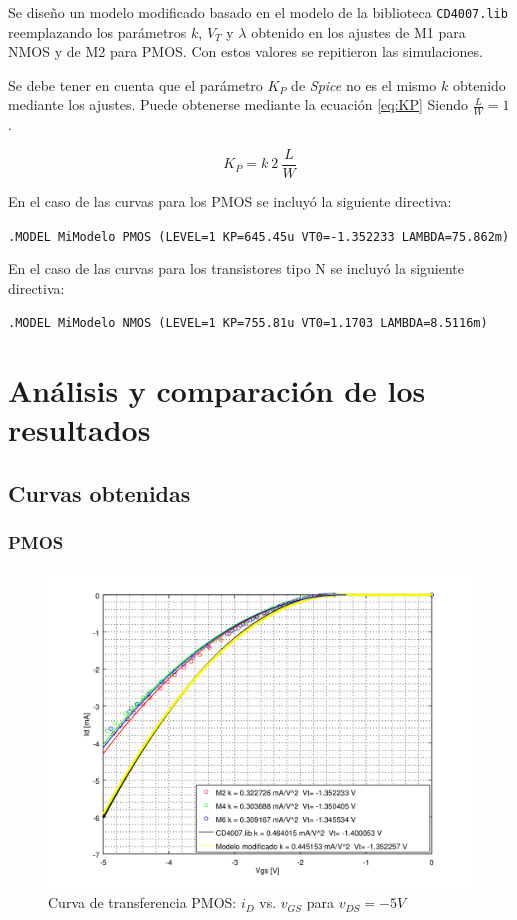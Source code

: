 \documentclass[10pt,spanish,a4paper,openany,notitlepage]{article}
\begin{document}
Se diseño un modelo modificado basado en el modelo de la biblioteca \texttt{CD4007.lib} reemplazando los parámetros $k$, $V_T$ y $\lambda$ obtenido en los ajustes de M1 para NMOS y de M2 para PMOS. Con estos valores se repitieron las simulaciones.

Se debe tener en cuenta que el parámetro $K_P$ de \emph{Spice} no es el mismo $k$ obtenido mediante los ajustes. Puede obtenerse mediante la ecuación \ref{eq:KP} Siendo $\frac{L}{W} = 1$.

\begin{equation}
\displaystyle K_P = k\ 2\ \frac{L}{W}
\label{eq:KP}
\end{equation}

En el caso de las curvas para los PMOS se incluyó la siguiente directiva: 
    
\texttt{.MODEL MiModelo PMOS (LEVEL=1 KP=645.45u VT0=-1.352233 LAMBDA=75.862m)}
    
En el caso de las curvas para los transistores tipo N se incluyó la siguiente directiva:

\texttt{.MODEL MiModelo NMOS (LEVEL=1 KP=755.81u VT0=1.1703 LAMBDA=8.5116m)}


\section{Análisis y comparación de los resultados}

\subsection{Curvas obtenidas}

\subsubsection{PMOS}

\begin{figure}[H] %
\begin{center}
\includegraphics[scale=0.65]{./octave/P_ID_VG.png}
\caption{Curva de transferencia PMOS: $i_D$ vs. $v_{GS}$ para $v_{DS} = -5 \unit{V}$}
 \label{fig:P_ID_VG}
\end{center}
\end{figure}
\end{document}
